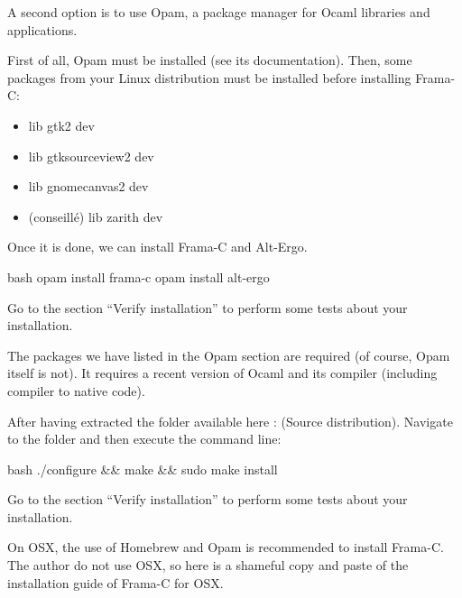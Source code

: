 \documentclass[middle]{zmdocument}
\begin{document}
A second option is to use Opam, a package manager for Ocaml libraries
and applications.



First of all, Opam must be installed (see its documentation). Then, some
packages from your Linux distribution must be installed before
installing Frama-C:



\begin{itemize}
\item lib gtk2 dev
\item lib gtksourceview2 dev
\item lib gnomecanvas2 dev
\item (conseillé) lib zarith dev
\end{itemize}



Once it is done, we can install Frama-C and Alt-Ergo.




\begin{CodeBlock}{bash}
opam install frama-c
opam install alt-ergo
\end{CodeBlock}



Go to the section ``Verify installation'' to perform some tests about
your installation.





The packages we have listed in the Opam section are required (of course,
Opam itself is not). It requires a recent version of Ocaml and its
compiler (including compiler to native code).



After having extracted the folder available here :
 (Source distribution).
Navigate to the folder and then execute the command line:



\begin{CodeBlock}{bash}
./configure && make && sudo make install
\end{CodeBlock}



Go to the section ``Verify installation'' to perform some tests about
your installation.





On OSX, the use of Homebrew and Opam is recommended to install Frama-C.
The author do not use OSX, so here is a shameful copy and paste of the
installation guide of Frama-C for OSX.
\end{document}
